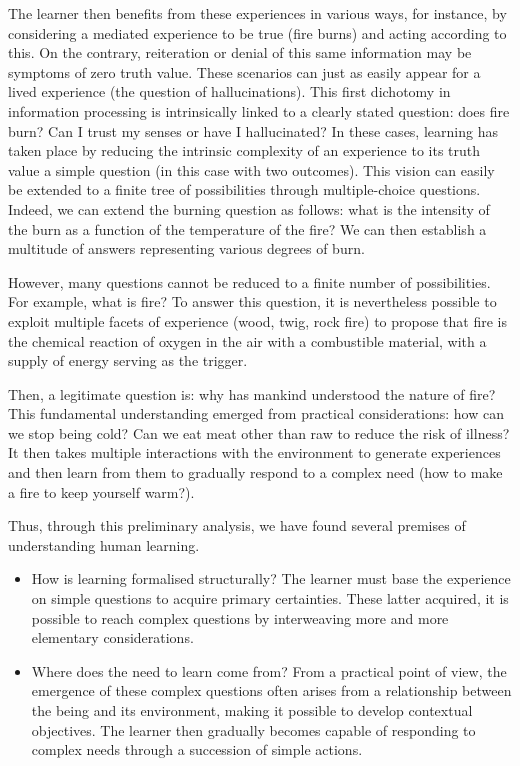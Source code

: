 The learner then benefits from these experiences in various ways, for instance, by considering a mediated experience to be true (fire burns) and acting according to this. On the contrary, reiteration or denial of this same information may be symptoms of zero truth value. These scenarios can just as easily appear for a lived experience (the question of hallucinations). This first dichotomy in information processing is intrinsically linked to a clearly stated question: does fire burn? Can I trust my senses or have I hallucinated? In these cases, learning has taken place by reducing the intrinsic complexity of an experience to its truth value \wrt a simple question (in this case with two outcomes).  This vision can easily be extended to a finite tree of possibilities through multiple-choice questions. Indeed, we can extend the burning question as follows: what is the intensity of the burn as a function of the temperature of the fire? We can then establish a multitude of answers representing various degrees of burn. 

However, many questions cannot be reduced to a finite number of possibilities. For example, what is fire? To answer this question, it is nevertheless possible to exploit multiple facets of experience (wood, twig, rock fire) to propose that fire is the chemical reaction of oxygen in the air with a combustible material, with a supply of energy serving as the trigger. 

Then, a legitimate question is: why has mankind understood the nature of fire? This fundamental understanding emerged from practical considerations: how can we stop being cold? Can we eat meat other than raw to reduce the risk of illness? It then takes multiple interactions with the environment to generate experiences and then learn from them to gradually respond to a complex need (how to make a fire to keep yourself warm?).

Thus, through this preliminary analysis, we have found several premises of understanding human learning.

\begin{itemize}
    \item How is learning formalised structurally?
    The learner must base the experience on simple questions to acquire primary certainties. These latter acquired, it is possible to reach complex questions by interweaving more and more elementary considerations.
    \item Where does the need to learn come from?
    From a practical point of view, the emergence of these complex questions often arises from a relationship between the being and its environment, making it possible to develop contextual objectives. The learner then gradually becomes capable of responding to complex needs through a succession of simple actions.
\end{itemize}
 
